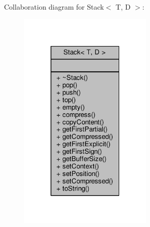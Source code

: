 Collaboration diagram for Stack$<$ T, D $>$\+:
\nopagebreak
\begin{figure}[H]
\begin{center}
\leavevmode
\includegraphics[width=181pt]{class_stack__coll__graph}
\end{center}
\end{figure}
